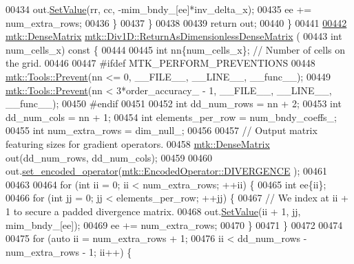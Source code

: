 \begin{DoxyCode}
{{00434       out.\hyperlink{classmtk_1_1DenseMatrix_a784ce5784109ac86bfb9d8562b334b13}{SetValue}(rr, cc, -mim\_bndy\_[ee]*inv\_delta\_x);
00435       ee += num\_extra\_rows;
00436     \}
00437   \}
00438 
00439   \textcolor{keywordflow}{return} out;
00440 \}
00441 
\hypertarget{mtk__div__1d_8cc_source_l00442}{}\hyperlink{classmtk_1_1Div1D_af2546ad1568ef39a6075f03bb395719e}{00442} \hyperlink{classmtk_1_1DenseMatrix}{mtk::DenseMatrix} \hyperlink{classmtk_1_1Div1D_af2546ad1568ef39a6075f03bb395719e}{mtk::Div1D::ReturnAsDimensionlessDenseMatrix}
      (
00443   \textcolor{keywordtype}{int} num\_cells\_x)\textcolor{keyword}{ const }\{
00444 
00445   \textcolor{keywordtype}{int} nn\{num\_cells\_x\}; \textcolor{comment}{// Number of cells on the grid.}
00446 
00447 \textcolor{preprocessor}{  #ifdef MTK\_PERFORM\_PREVENTIONS}
00448   \hyperlink{classmtk_1_1Tools_a332324c6f25e66be9dff48c5987a3b9f}{mtk::Tools::Prevent}(nn <= 0, \_\_FILE\_\_, \_\_LINE\_\_, \_\_func\_\_);
00449   \hyperlink{classmtk_1_1Tools_a332324c6f25e66be9dff48c5987a3b9f}{mtk::Tools::Prevent}(nn < 3*order\_accuracy\_ - 1, \_\_FILE\_\_, \_\_LINE\_\_, \_\_func\_\_);
00450 \textcolor{preprocessor}{  #endif}
00451 
00452   \textcolor{keywordtype}{int} dd\_num\_rows = nn + 2;
00453   \textcolor{keywordtype}{int} dd\_num\_cols = nn + 1;
00454   \textcolor{keywordtype}{int} elements\_per\_row = num\_bndy\_coeffs\_;
00455   \textcolor{keywordtype}{int} num\_extra\_rows = dim\_null\_;
00456 
00457   \textcolor{comment}{// Output matrix featuring sizes for gradient operators.}
00458   \hyperlink{classmtk_1_1DenseMatrix}{mtk::DenseMatrix} out(dd\_num\_rows, dd\_num\_cols);
00459 
00460   out.\hyperlink{classmtk_1_1DenseMatrix_ac0f824b0fec88c4fb42e77b7550fb0d3}{set\_encoded\_operator}(\hyperlink{namespacemtk_ga9b50023bfb2692219d2915feade94f80a4e4e9e6d004c642e33d6f823b57bd60e}{mtk::EncodedOperator::DIVERGENCE}
      );
00461 
00463 
00464   \textcolor{keywordflow}{for} (\textcolor{keywordtype}{int} ii = 0; ii < num\_extra\_rows; ++ii) \{
00465     \textcolor{keywordtype}{int} ee\{ii\};
00466     \textcolor{keywordflow}{for} (\textcolor{keywordtype}{int} jj = 0; jj < elements\_per\_row; ++jj) \{
00467       \textcolor{comment}{// We index at ii + 1 to secure a padded divergence matrix.}
00468       out.\hyperlink{classmtk_1_1DenseMatrix_a784ce5784109ac86bfb9d8562b334b13}{SetValue}(ii + 1, jj, mim\_bndy\_[ee]);
00469       ee += num\_extra\_rows;
00470     \}
00471   \}
00472 
00474 
00475   \textcolor{keywordflow}{for} (\textcolor{keyword}{auto} ii = num\_extra\_rows + 1;
00476        ii < dd\_num\_rows - num\_extra\_rows - 1; ii++) \{
}}
\end{DoxyCode}
